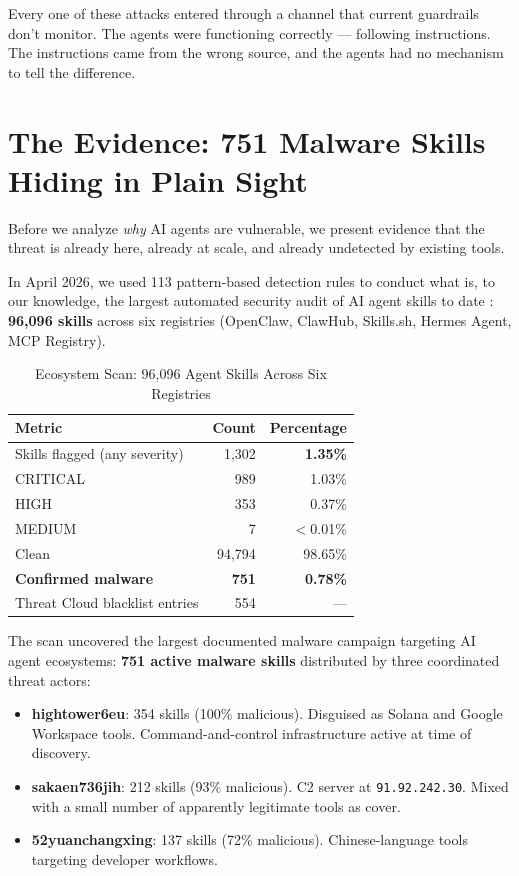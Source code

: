 \documentclass[11pt,letterpaper]{article}
\begin{document}
Every one of these attacks entered through a channel that current guardrails don't monitor. The agents were functioning correctly --- following instructions. The instructions came from the wrong source, and the agents had no mechanism to tell the difference.


\section{The Evidence: 751 Malware Skills Hiding in Plain Sight}
\label{sec:evidence}

Before we analyze \textit{why} AI agents are vulnerable, we present evidence that the threat is already here, already at scale, and already undetected by existing tools.

In April 2026, we used 113 pattern-based detection rules to conduct what is, to our knowledge, the largest automated security audit of AI agent skills to date \cite{atrscanmega}: \textbf{96,096 skills} across six registries (OpenClaw, ClawHub, Skills.sh, Hermes Agent, MCP Registry).

\begin{table}[htbp]
\centering
\caption{Ecosystem Scan: 96,096 Agent Skills Across Six Registries}
\label{tab:megascan}
\begin{tabular}{lrr}
\toprule
\textbf{Metric} & \textbf{Count} & \textbf{Percentage} \\
\midrule
Skills flagged (any severity) & 1,302 & \textbf{1.35\%} \\
CRITICAL & 989 & 1.03\% \\
HIGH & 353 & 0.37\% \\
MEDIUM & 7 & $<$0.01\% \\
Clean & 94,794 & 98.65\% \\
\textbf{Confirmed malware} & \textbf{751} & \textbf{0.78\%} \\
Threat Cloud blacklist entries & 554 & --- \\
\bottomrule
\end{tabular}
\end{table}

The scan uncovered the largest documented malware campaign targeting AI agent ecosystems: \textbf{751 active malware skills} distributed by three coordinated threat actors:

\begin{itemize}
\item \textbf{hightower6eu}: 354 skills (100\% malicious). Disguised as Solana and Google Workspace tools. Command-and-control infrastructure active at time of discovery.
\item \textbf{sakaen736jih}: 212 skills (93\% malicious). C2 server at \texttt{91.92.242.30}. Mixed with a small number of apparently legitimate tools as cover.
\item \textbf{52yuanchangxing}: 137 skills (72\% malicious). Chinese-language tools targeting developer workflows.
\end{itemize}
\end{document}

